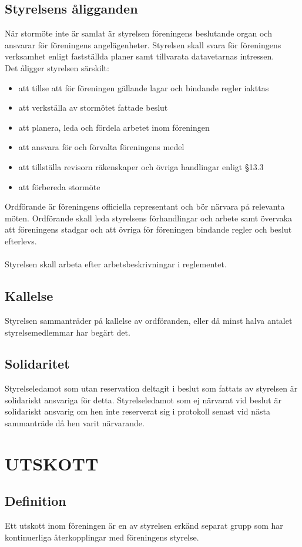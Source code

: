 \documentclass[a4paper]{article}
\begin{document}
{{  \subsection{Styrelsens åligganden}
  När stormöte inte är samlat är styrelsen föreningens beslutande organ och ansvarar för föreningens angelägenheter. Styrelsen skall svara för föreningens verksamhet enligt fastställda planer samt tillvarata datavetarnas intressen.\\
  Det åligger styrelsen särskilt:
  \begin{itemize}
  \item att tillse att för föreningen gällande lagar och bindande regler iakttas
  \item att verkställa av stormötet fattade beslut
  \item att planera, leda och fördela arbetet inom föreningen
  \item att ansvara för och förvalta föreningens medel
  \item att tillställa revisorn räkenskaper och övriga handlingar enligt §13.3
  \item att förbereda stormöte
  \end{itemize}
  Ordförande är föreningens officiella representant och bör närvara på relevanta möten. Ordförande skall leda styrelsens förhandlingar och arbete samt övervaka att föreningens stadgar och att övriga för föreningen bindande regler och beslut efterlevs.\\
  \\
  Styrelsen skall arbeta efter arbetsbeskrivningar i reglementet.
  \subsection{Kallelse}
  Styrelsen sammanträder på kallelse av ordföranden, eller då minst halva antalet styrelsemedlemmar har begärt det.
  \subsection{Solidaritet}
  Styrelseledamot som utan reservation deltagit i beslut som fattats av styrelsen är solidariskt ansvariga för detta. Styrelseledamot som ej närvarat vid beslut är solidariskt ansvarig om hen inte reserverat sig i protokoll senast vid nästa sammanträde då hen varit närvarande.}
\section{UTSKOTT}
{\subsection{Definition}
  Ett utskott inom föreningen är en av styrelsen erkänd separat grupp som har kontinuerliga återkopplingar med föreningens styrelse.
}}
\end{document}
